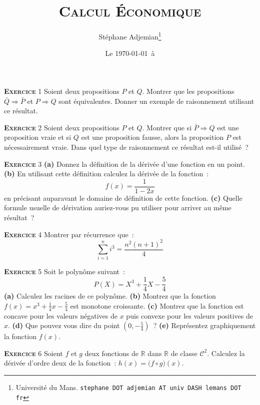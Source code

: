 \documentclass[10pt,a4paper,notitlepage,twocolumn]{article}
\newcommand{\exercice}[1]{\textsc{\textbf{Exercice}} #1}
\begin{document}
\title{\textsc{Calcul Économique}}
\author{Stéphane Adjemian\thanks{Université du Mans. \texttt{stephane DOT adjemian AT univ DASH lemans DOT fr}}}
\date{Le \today\ à \thistime}

\maketitle
\thispagestyle{empty}

\exercice{1} Soient deux propositions $P$ et $Q$. Montrer que les
propositions $\bar Q \Rightarrow \bar P$ et $P \Rightarrow Q$ sont
équivalentes. Donner un exemple de raisonnement utilisant ce résultat.

\bigskip

\exercice{2} Soient deux propositions $P$ et $Q$. Montrer que si
$\bar P \Rightarrow Q$ est une proposition vraie et si $Q$ est une proposition
fausse, alors la proposition $P$ est nécessairement vraie. Dans quel type de
raisonnement ce résultat est-il utilisé ?
	
\bigskip

\exercice{3} \textbf{(a)} Donnez la définition de la dérivée d'une fonction en
un point. \textbf{(b)} En utilisant cette définition calculez la dérivée de la
fonction~:
\[
f(x) = \frac{1}{1-2x}
\]
en précisant auparavant le domaine de définition de cette fonction. \textbf{(c)}
Quelle formule usuelle de dérivation auriez-vous pu utiliser pour arriver au
même résultat~?

\bigskip

\exercice{4} Montrer par récurrence que~:
\begin{equation}
  \sum_{i=1}^n i^3  = \frac{n^2(n+1)^2}{4}
\end{equation}

\bigskip

\exercice{5} Soit le polynôme suivant~:
\[
P(X) = X^3 + \frac{1}{4}X - \frac{5}{4}
\]    
\textbf{(a)} Calculez les racines de ce polynôme. \textbf{(b)} Montrez que la
fonction $f(x)=x^3+\frac{1}{4}x-\frac{5}{4}$ est monotone croissante.
\textbf{(c)} Montrez que la fonction est concave pour les valeurs négatives de
$x$ puis convexe pour les valeurs positives de $x$. \textbf{(d)} Que pouvez vous
dire du point $(0,-\frac{5}{4})$~? \textbf{(e)} Représentez graphiquement la fonction $f(x)$.

\bigskip

\exercice{6} Soient $f$ et $g$ deux fonctions de $\mathbb R$ dans $\mathbb R$ de
classe $\mathcal C^2$. Calculez la dérivée d'ordre deux de la fonction~:
$h(x) = \bigl(f \circ g\bigr) (x)$.
\end{document}
